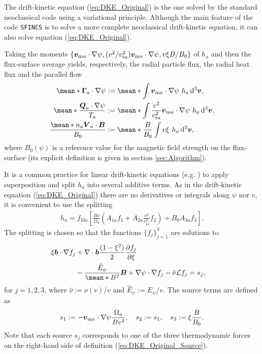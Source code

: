 The drift-kinetic equation (\ref{eq:DKE_Original}) is the one solved by the standard neoclassical code {\DKES} \cite{DKES1986, VanRij_1989} using a variational principle. 
Although the main feature of the code \texttt{SFINCS} \cite{Landreman_2014} is to solve a more complete neoclassical drift-kinetic equation, it can also solve equation (\ref{eq:DKE_Original}).

Taking the moments $\{\vb*{v}_{\text{m} a} \cdot \nabla\psi,  (v^2/v_{\text{t}a}^2)\vb*{v}_{\text{m} a} \cdot \nabla\psi, v\xi B/B_0\}$ of $h_a$ and then the flux-surface average yields, respectively, the radial particle flux, the radial heat flux and the parallel flow
%
\begin{align}
	\mean*{\vb*{\Gamma}_a \cdot \nabla \psi} & := 
	\mean*{
		\int
		\vb*{v}_{\text{m} a} \cdot \nabla\psi	
		\ h_a
		\dd[3]{\vb*{v}}
	},
   \label{eq:Particle_flux_Original}
	\\
	\mean*{\frac{\vb*{Q}_a \cdot \nabla \psi}{T_a}} & := 
	\mean*{
		\int
		\frac{v^2}{v_{\text{t}a}^2}\vb*{v}_{\text{m} a} \cdot \nabla\psi	
		\ h_a
		\dd[3]{\vb*{v}}
	},
    \label{eq:Heat_flux_Original}
	\\
	\frac{\mean*{n_a \vb*{V}_{a} \cdot\vb*{B}}}{B_{0}} & :=
	\mean*{
		\frac{B}{B_0}
		\int
		v \xi 
		\ h_a
		\dd[3]{\vb*{v}}
	},
    \label{eq:Parallel_flow_Original}
\end{align}
where $B_0(\psi)$ is a reference value for the magnetic field strength on the flux-surface (its explicit definition is given in section \ref{sec:Algorithm}).

It is a common practice for linear drift-kinetic equations (e.g. \cite{DKES1986, Beidler_2011,Landreman_2014}) to apply superposition and split $h_a$ into several additive terms. As in the drift-kinetic equation (\ref{eq:DKE_Original}) there are no derivatives or integrals along $\psi$ nor $v$, it is convenient to use the splitting
%
\begin{align}
	h_a 
	= 
	f_{\text{M}a}
	\left[
	\frac{B v}{\Omega_a} 
	\left(
	A_{1a} f_1 
	+ 
	A_{2a}  
	\frac{v^2}{v_{\text{t}a}^2}f_2
	\right)
	+
	B_0 A_{3a} f_3
	\right].
	\label{eq:Distribution_function_superposition}
\end{align}
The splitting is chosen so that the functions $\{f_j\}_{j=1}^{3}$ are solutions to
%
\begin{align}
	\xi \vb*{b}  \cdot 
	\nabla f_j
	& +
	\nabla \cdot \vb*{b} \frac{(1-\xi^2)}{2}  \pdv{f_j}{\xi}  
	\nonumber\\
	&
	- 
	\frac{\hat{E}_\psi}{\mean*{B^2}}
	\vb*{B}\times \nabla\psi\cdot \nabla f_j
%	 
	\label{eq:DKE}
	- \hat{\nu}\Lorentz f_j
	=  s_j, \quad 
\end{align}
for $j=1,2,3$, where $\hat{\nu} := \nu(v) / v$ and $\hat{E}_\psi := {E}_\psi/v$. The source terms are defined as
%
\begin{align}
	s_1 := - \vb*{v}_{\text{m} a} \cdot \nabla\psi \frac{\Omega_a}{B v^2},
	\quad
	s_2 :=  s_1, 
	\quad
	s_3 := \xi \frac{B}{B_0}.
	\label{eq:DKE_Sources}
\end{align} 
Note that each source $s_j$ corresponds to one of the three thermodynamic forces on the right-hand side of definition (\ref{eq:DKE_Original_Source}).

